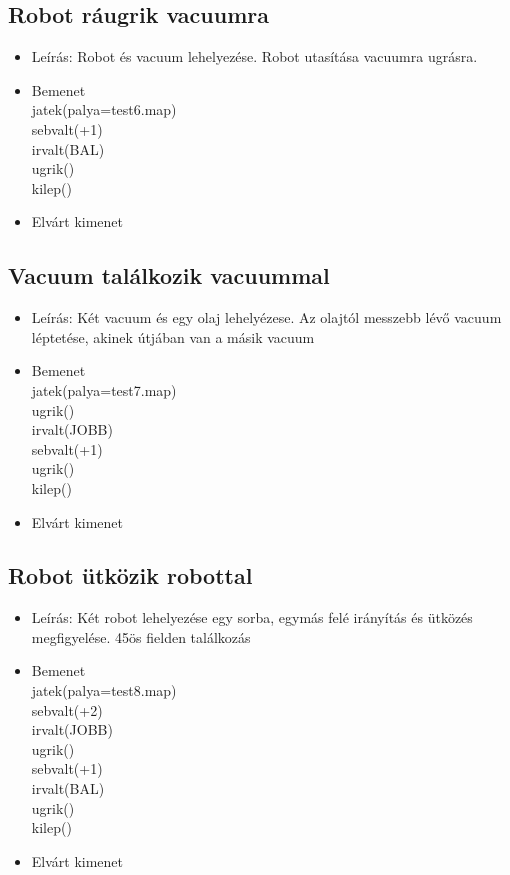 \subsection{Robot ráugrik vacuumra}
\begin{itemize}
	\item Leírás: Robot és vacuum lehelyezése. Robot utasítása vacuumra ugrásra.
	\item Bemenet\\
    jatek(palya=test6.map)\\
    sebvalt(+1)\\
    irvalt(BAL)\\
    ugrik()\\
    kilep()\\
	\item Elvárt kimenet\\

\end{itemize}

\subsection{Vacuum találkozik vacuummal}
\begin{itemize}
	\item Leírás: Két vacuum és egy olaj lehelyézese. Az olajtól messzebb lévő vacuum léptetése, akinek útjában van a másik vacuum
	\item Bemenet\\
    jatek(palya=test7.map) \\
    ugrik() \\
    irvalt(JOBB) \\
    sebvalt(+1) \\
    ugrik() \\
    kilep()\\
	\item Elvárt kimenet\\

\end{itemize}

\subsection{Robot ütközik robottal}
\begin{itemize}
	\item Leírás: Két robot lehelyezése egy sorba, egymás felé irányítás és ütközés megfigyelése. 45ös fielden találkozás
	\item Bemenet\\
    jatek(palya=test8.map)\\
    sebvalt(+2)\\
    irvalt(JOBB)\\
    ugrik()\\
    sebvalt(+1)\\
    irvalt(BAL)\\
    ugrik()\\
    kilep()\\
	\item Elvárt kimenet\\

\end{itemize}

